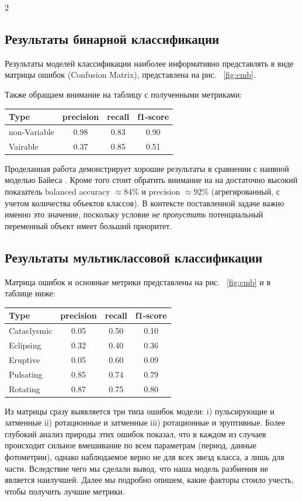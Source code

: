\documentclass[11pt, a4paper]{article}
\begin{document}
\begin{multicols}{2}
    \subsection{Результаты бинарной классификации}
    Результаты моделей классификации наиболее информативно представлять в виде матрицы ошибок (Confusion Matrix), представлена на рис. ~\ref{fig:cmb}.

    Также обращаем внимание на таблицу с полученными метриками:
    \begin{center}
    \renewcommand{\arraystretch}{1.25}
        \begin{tabular}{lccc}
        \hline\hline
            Type & precision & recall & f1-score \\ \hline
            non-Variable & 0.98 & 0.83 & 0.90 \\
            Vairable & 0.37 & 0.85 & 0.51 \\
        \hline\hline
    \end{tabular}
    \end{center}
    Проделанная работа демонстрирует хорошие результаты в сравнении с наивной моделью Байеса \autocite{Wozniak2003}. Кроме того стоит обратить внимание на на достаточно высокий показатель balanced accuracy $\approx84\%$ и precision $\approx 92\%$ (агрегированный, с учетом количества объектов классов). В контексте поставленной задаче важно именно это значение, поскольку условие \textit{не пропустить} потенциальный переменный объект имеет больший приоритет.

    \subsection{Результаты мультиклассовой классификации}
    Матрица ошибок и основные метрики представлены на рис. ~\ref{fig:cmb} и в таблице ниже:
    \begin{center}
    \renewcommand{\arraystretch}{1.25}
    \begin{tabular}{lccc}
        \hline\hline
            Type & precision & recall & f1-score \\ \hline
            Cataclysmic & 0.05 & 0.50 & 0.10 \\
            Eclipsing & 0.32 & 0.40 & 0.36 \\
            Eruptive & 0.05 & 0.60 & 0.09 \\
            Pulsating & 0.85 & 0.74 & 0.79 \\
            Rotating & 0.87 & 0.75 & 0.80 \\
        \hline\hline
    \end{tabular}
    \end{center}
    Из матрицы сразу выявляется три типа ошибок модели: i) пульсирующие и затменные ii) ротационные и затменные iii) ротационные и эруптивные. Более глубокий анализ природы этих ошибок показал, что в каждом из случаев происходит сильное вмешивание по всем параметрам (период, данные фотометрии), однако наблюдаемое верно не для всех звезд класса, а лишь для части. Вследствие чего мы сделали вывод, что наша модель разбиения не является наилучшей. Далее мы подробно опишем, какие факторы стоило учесть, чтобы получить лучшие метрики.


\end{multicols}
\end{document}
